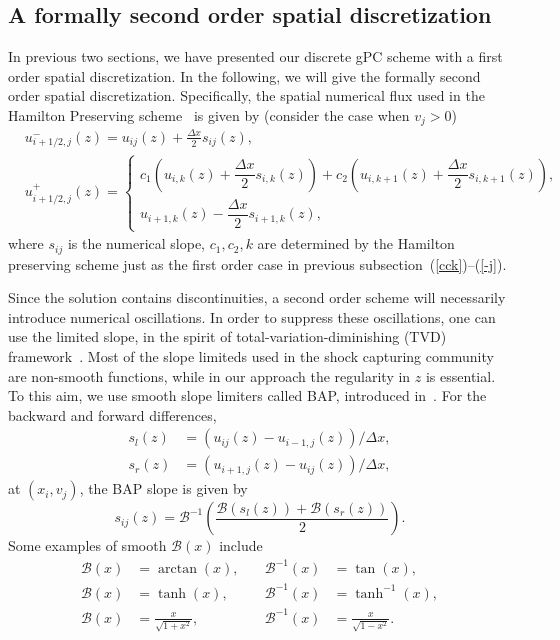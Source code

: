 \documentclass[12pt]{article}
\theoremstyle{plain}
\theoremstyle{remark}
\theoremstyle{remark}
\theoremstyle{remark}
\numberwithin{equation}{section}
\begin{document}
\subsection{A formally second order  spatial discretization}
In previous two sections, we have presented our discrete gPC scheme with a first order spatial discretization. In the following, we will give the formally second 
order spatial discretization. Specifically, the spatial numerical flux
used in the Hamilton Preserving scheme~\cite{Wen:2005ueba} is given by (consider the case when $v_j>0$)
\begin{equation}\label{xflux}
  \begin{aligned}
    &u^-_{i+1/2,j}(z) = u_{ij}(z) + \frac{\Delta x}{2}s_{ij}(z), \\
    &u^+_{i+1/2,j}(z) = 
    \begin{cases}
      c_1\left(u_{i,k}(z) + \dfrac{\Delta x}{2}s_{i,k}(z)\right) + c_2\left(u_{i,k+1}(z) + \dfrac{\Delta x}{2}s_{i,k+1}(z)\right),  \\
      u_{i+1, k}(z) - \dfrac{\Delta x}{2}s_{i+1, k}(z),
    \end{cases}
  \end{aligned}
\end{equation}
where $s_{ij}$ is the numerical slope, $c_1,c_2,k$ are determined by the Hamilton preserving scheme just as the first order case in previous subsection~(\ref{cck})--(\ref{-j}).

Since the solution contains discontinuities, a second order scheme will necessarily introduce numerical oscillations. In order to suppress these oscillations, one can use the limited slope, in the spirit of total-variation-diminishing
(TVD) framework~\cite{LeVeque}. Most of the slope limiteds used in the
shock capturing community are non-smooth functions, while in our approach
the regularity in $z$ is essential. To this aim, we use smooth slope
limiters called BAP, introduced in~\cite{Liu:1998faba}. For the backward and forward differences, 
\begin{equation}
\begin{aligned}
  s_l(z) &= (u_{ij}(z)-u_{i-1,j}(z))/\Delta x, \\
  s_r(z) &= (u_{i+1,j}(z)-u_{ij}(z))/\Delta x,
\end{aligned}
\end{equation}
at $(x_i,v_j)$, the BAP slope is given by
\begin{equation}
  s_{ij}(z)=\mathcal{B}^{-1}\left(\frac{\mathcal{B}(s_l(z))+\mathcal{B}(s_r(z))}{2}\right).
\end{equation}
Some examples of smooth $\mathcal{B}(x)$ include
\begin{equation}
  \begin{aligned}
    \mathcal{B}(x)&=\arctan(x), \quad&\mathcal{B}^{-1}(x)&=\tan(x), \\
    \mathcal{B}(x)&=\tanh(x), \quad& \mathcal{B}^{-1}(x)&=\tanh^{-1}(x), \\
    \mathcal{B}(x)&=\frac{x}{\sqrt{1+x^2}}, \quad& \mathcal{B}^{-1}(x)&=\frac{x}{\sqrt{1-x^2}}.
  \end{aligned}
\end{equation}
\end{document}
